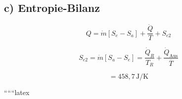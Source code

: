 \subsection*{c) Entropie-Bilanz}

\[
Q = \dot{m} [S_e - S_a] + \frac{\dot{Q}}{T} + S_{e2}
\]

\[
S_{e2} = \dot{m} [S_a - S_e] = \frac{\dot{Q}_R}{T_R} + \frac{\dot{Q}_{\text{Aus}}}{\overline{T}}
\]

\[
= 458,7 \, \text{J/K}
\]

``````latex